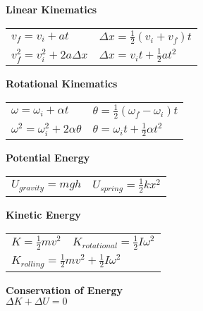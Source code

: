 \documentclass[12pt]{article}
\begin{document}
\begin{minipage}[t]{.5\textwidth}
\textbf{Linear Kinematics} \\[6pt]
	\begin{tabular}{p{3cm} p{6cm}}
	$v_f = v_i + at$ & \hspace{12pt} $\Delta x = \tfrac{1}{2}(v_i + v_f)t$\\[6pt]
	$v_f^2 = v_i^2 + 2a \Delta x$ & \hspace{12pt} $\Delta x = v_i t + \tfrac{1}{2} at^2$\\[12pt]
	\end{tabular}

\textbf{Rotational Kinematics} \\[6pt]
	\begin{tabular}{p{3cm} p{6cm}}
	$\omega = \omega_i +\alpha t$ & \hspace{12pt} $\theta = \tfrac{1}{2} (\omega_f - \omega_i) t$ \\[6pt]
	$\omega^2 = \omega_i^2 + 2\alpha \theta$ & \hspace{12pt} $\theta = \omega_i t + \tfrac{1}{2} \alpha t^2$ \\
	\end{tabular}
\end{minipage}

\vspace{12pt}
\begin{minipage}[t]{.5\textwidth}
\textbf{Potential Energy} \\[6pt]
	\begin{tabular}{p{3cm} p{6cm}}
	$U_{gravity} = mgh$ & $U_{spring} = \tfrac{1}{2} kx^2$ \\[12pt]
	\end{tabular}

\textbf{Kinetic Energy} \\[6pt]
	\begin{tabular}{p{3cm} p{6cm}}
	$K = \tfrac{1}{2}mv^2$ & $K_{rotational} = \tfrac{1}{2} I \omega^2$ \\[6pt]
	\multicolumn{2}{l}{	
	$K_{rolling} = \tfrac{1}{2}mv^2 + \tfrac{1}{2}I\omega^2$} \\[12pt]
	\end{tabular}

\textbf{Conservation of Energy} \\[6pt]
	$\Delta K + \Delta U = 0$\\[6pt]
\end{minipage}
\end{document}
